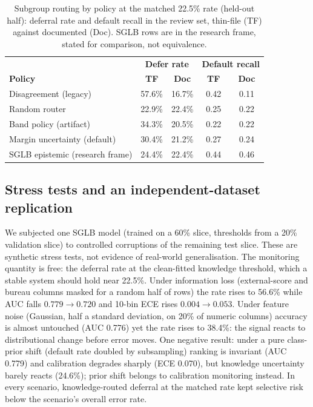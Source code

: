 \documentclass[conference]{IEEEtran}
\begin{document}
\begin{table}[t]
\centering
\caption{Subgroup routing by policy at the matched 22.5\% rate (held-out
half): deferral rate and default recall in the review set, thin-file (TF)
against documented (Doc). SGLB rows are in the research frame, stated for
comparison, not equivalence.}
\label{tab:subrouting}
\begin{tabular}{@{}l c c c c@{}}
\toprule
& \multicolumn{2}{c}{\textbf{Defer rate}} & \multicolumn{2}{c}{\textbf{Default recall}} \\
\textbf{Policy} & \textbf{TF} & \textbf{Doc} & \textbf{TF} & \textbf{Doc} \\
\midrule
Disagreement (legacy) & 57.6\% & 16.7\% & 0.42 & 0.11 \\
Random router & 22.9\% & 22.4\% & 0.25 & 0.22 \\
Band policy (artifact) & 34.3\% & 20.5\% & 0.22 & 0.22 \\
Margin uncertainty (default) & 30.4\% & 21.2\% & 0.27 & 0.24 \\
SGLB epistemic (research frame) & 24.4\% & 22.4\% & 0.44 & 0.46 \\
\bottomrule
\end{tabular}
\end{table}

\subsection{Stress tests and an independent-dataset replication}\label{sec:taiwan}
We subjected one SGLB model (trained on a 60\% slice, thresholds from a
20\% validation slice) to controlled corruptions of the remaining test
slice. These are synthetic stress tests, not evidence of real-world
generalisation. The monitoring quantity is free: the deferral rate at the
clean-fitted knowledge threshold, which a stable system should hold near
22.5\%. Under information loss (external-score and bureau columns masked
for a random half of rows) the rate rises to 56.6\% while AUC falls
$0.779 \to 0.720$ and 10-bin ECE rises $0.004 \to 0.053$. Under feature
noise (Gaussian, half a standard deviation, on 20\% of numeric columns)
accuracy is almost untouched (AUC 0.776) yet the rate rises to 38.4\%: the
signal reacts to distributional change before error moves. One negative
result: under a pure class-prior shift (default rate doubled by
subsampling) ranking is invariant (AUC 0.779) and calibration degrades
sharply (ECE 0.070), but knowledge uncertainty barely reacts (24.6\%);
prior shift belongs to calibration monitoring instead. In every scenario,
knowledge-routed deferral at the matched rate kept selective risk below the
scenario's overall error rate.
\end{document}
